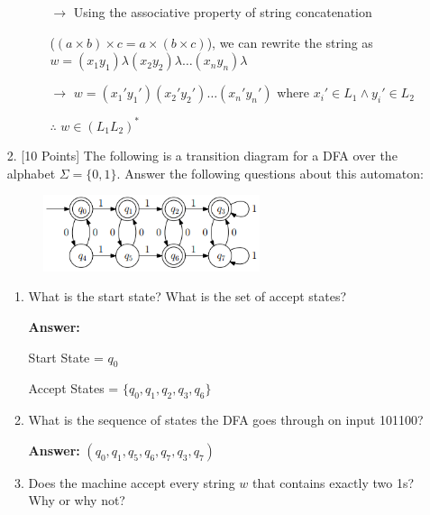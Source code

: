 \documentclass[12pt]{article}
\begin{document}
\begin{spacing}{1.5}
\begin{enumerate}
\begin{enumerate}
\begin{enumerate}
				                  $\rightarrow$ Using the associative property of string
				                  concatenation

				                  ($(a\times b) \times c = a \times (b \times c)$), we can rewrite the string as $w = (x_1y_1)\lambda(x_2y_2)\lambda \dots (x_ny_n)\lambda$

				                  $\rightarrow$ $w = (x_1'y_1')(x_2'y_2') \dots (x_n'y_n')$ where $x_i' \in L_1 \land y_i' \in L_2$

				                  $\therefore$ $w \in (L_1L_2)^*$

			            \end{enumerate}

		      \end{enumerate}

		      \newpage

		\item[2.] [10 Points] The following is a transition diagram for a DFA over the alphabet $\Sigma = \{0,1\}$. Answer the following questions about this automaton:

		      \begin{figure}[h!]
			      \centering
			      \includegraphics[width=0.6\textwidth]{img/q2/q2_automata.png}
		      \end{figure}

		      \begin{enumerate}
			      \item What is the start state? What is the set of accept states?

			            \noindent \textbf{Answer:}

			            Start State = $q_0$

			            Accept States = $\{q_0, q_1, q_2, q_3, q_6\}$

			      \item What is the sequence of states the DFA goes through on input 101100?

			            \noindent \textbf{Answer:} $(q_0, q_1, q_5, q_6, q_7, q_3, q_7)$

			      \item Does the machine accept every string $w$ that contains exactly two 1s? Why or why not?


\end{enumerate}
\end{enumerate}
\end{spacing}
\end{document}
